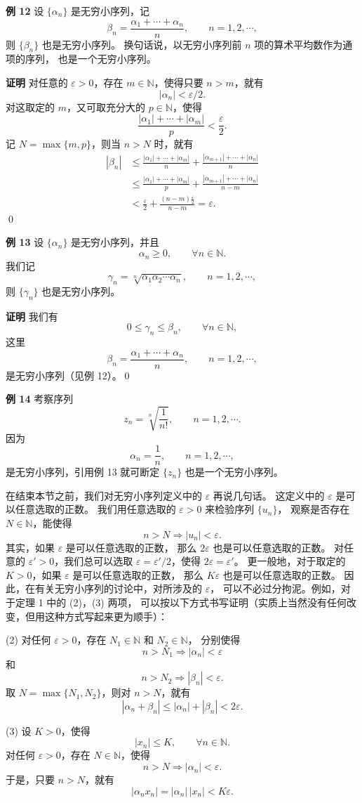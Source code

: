 \documentclass[12pt,a4paper,oneside]{ctexbook}
\begin{document}
\medskip
\textbf{例 12}\quad
设 $\{\alpha_n\}$ 是无穷小序列，记
\[
    \beta_n=\frac{\alpha_1+\cdots+\alpha_n}{n},\qquad n=1,2,\cdots,
\]
则 $\{\beta_n\}$ 也是无穷小序列。
换句话说，以无穷小序列前 $n$ 项的算术平均数作为通项的序列，
也是一个无穷小序列。

\textbf{证明}\quad
对任意的 $\varepsilon>0$，存在 $m\in\mathbb{N}$，使得只要 $n>m$，就有
\[
    |\alpha_n|<\varepsilon/2.
\]
对这取定的 $m$，又可取充分大的 $p\in\mathbb{N}$，使得
\[
    \frac{|\alpha_1|+\cdots+|\alpha_m|}{p}<\frac{\varepsilon}{2}.
\]
记 $N=\max\{m,p\}$，则当 $n>N$ 时，就有
\begin{align*}
|\beta_n|
&\le
\frac{|\alpha_1|+\cdots+|\alpha_m|}{n}
+\frac{|\alpha_{m+1}|+\cdots+|\alpha_n|}{n}\\
&\le
\frac{|\alpha_1|+\cdots+|\alpha_m|}{p}
+\frac{|\alpha_{m+1}|+\cdots+|\alpha_n|}{n-m}\\
&<\frac{\varepsilon}{2}
+\frac{(n-m)\frac{\varepsilon}{2}}{n-m}
=\varepsilon.
\end{align*}
\qed

\medskip
\textbf{例 13}\quad
设 $\{\alpha_n\}$ 是无穷小序列，并且
\[
    \alpha_n\ge 0,\qquad \forall n\in\mathbb{N}.
\]
我们记
\[
    \gamma_n=\sqrt[n]{\alpha_1\alpha_2\cdots\alpha_n},
    \qquad n=1,2,\cdots,
\]
则 $\{\gamma_n\}$ 也是无穷小序列。

\textbf{证明}\quad
我们有
\[
    0\le \gamma_n\le \beta_n,\qquad \forall n\in\mathbb{N},
\]
这里
\[
    \beta_n=\frac{\alpha_1+\cdots+\alpha_n}{n},\qquad n=1,2,\cdots,
\]
是无穷小序列（见例 12）。\qed

\medskip
\textbf{例 14}\quad
考察序列
\[
    z_n=\sqrt[n]{\frac{1}{n!}},\qquad n=1,2,\cdots.
\]
因为
\[
    \alpha_n=\frac1n,\qquad n=1,2,\cdots,
\]
是无穷小序列，引用例 13 就可断定 $\{z_n\}$ 也是一个无穷小序列。

在结束本节之前，我们对无穷小序列定义中的 $\varepsilon$ 再说几句话。
这定义中的 $\varepsilon$ 是可以任意选取的正数。
我们用任意选取的 $\varepsilon>0$ 来检验序列 $\{u_n\}$，
观察是否存在 $N\in\mathbb{N}$，能使得
\[
    n>N\Rightarrow |u_n|<\varepsilon.
\]
其实，如果 $\varepsilon$ 是可以任意选取的正数，
那么 $2\varepsilon$ 也是可以任意选取的正数。
对任意的 $\varepsilon'>0$，我们总可以选取
$\varepsilon=\varepsilon'/2$，使得 $2\varepsilon=\varepsilon'$。
更一般地，对于取定的 $K>0$，如果 $\varepsilon$ 是可以任意选取的正数，
那么 $K\varepsilon$ 也是可以任意选取的正数。
因此，在有关无穷小序列的讨论中，对所涉及的 $\varepsilon$，
可以不必过分拘泥。例如，对于定理 1 中的 (2)，(3) 两项，
可以按以下方式书写证明（实质上当然没有任何改变，但用这种方式写起来更为顺手）：

(2) 对任何 $\varepsilon>0$，存在 $N_1\in\mathbb{N}$ 和 $N_2\in\mathbb{N}$，
分别使得
\[
    n>N_1\Rightarrow |\alpha_n|<\varepsilon
\]
和
\[
    n>N_2\Rightarrow |\beta_n|<\varepsilon.
\]
取 $N=\max\{N_1,N_2\}$，则对 $n>N$，就有
\[
    |\alpha_n+\beta_n|\le |\alpha_n|+|\beta_n|<2\varepsilon.
\]

(3) 设 $K>0$，使得
\[
    |x_n|\le K,\qquad \forall n\in\mathbb{N}.
\]
对任何 $\varepsilon>0$，存在 $N\in\mathbb{N}$，使得
\[
    n>N\Rightarrow |\alpha_n|<\varepsilon.
\]
于是，只要 $n>N$，就有
\[
    |\alpha_nx_n|=|\alpha_n|\,|x_n|<K\varepsilon.
\]

\ifx\allfiles\undefined %
\end{document}
